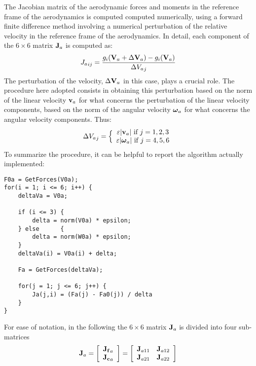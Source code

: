 The Jacobian matrix of the aerodynamic forces and moments in the reference 
frame of the aerodynamics is computed computed numerically,
using a forward finite difference method involving a numerical perturbation
of the relative velocity in the reference frame of the aerodynamics.
In detail, each component of the $6\times6$ matrix $\T{J}_a$ is computed as:
\begin{equation}
	{J_a}_{ij} = \frac{g_i(\T{V}_a + \Delta\T{V}_a) 
		- g_i(\T{V}_a)}{\Delta {V_a}_j}
\end{equation}
The perturbation of the velocity, $\Delta\T{V}_a$ in this case, plays
a crucial role. The procedure here adopted consists in obtaining this
perturbation based on the norm of the linear velocity $\T{v}_a$ for what 
concerns the perturbation of the linear velocity components, based on
the norm of the angular velocity $\T{\omega}_a$ for what concerns 
the angular velocity components. Thus:
\begin{equation}
	\Delta {V_a}_j = \Bigl\{\matr{c}{
		\varepsilon\lvert\T{v}_a\lvert\text{ if $j = 1,2,3$}\\
		\varepsilon\lvert\T{\omega}_a\lvert\text{ if $j = 4,5,6$}
		}
\end{equation}
To summarize the procedure, it can be helpful to report the algorithm
actually implemented:
\begin{verbatim}
F0a = GetForces(V0a);
for(i = 1; i <= 6; i++)	{
    deltaVa = V0a; 
				
    if (i <= 3)	{
        delta = norm(V0a) * epsilon;
    } else		{
        delta = norm(W0a) * epsilon;
    }
    deltaVa(i) = V0a(i) + delta;
					
    Fa = GetForces(deltaVa);
	
    for(j = 1; j <= 6; j++)	{
        Ja(j,i) = (Fa(j) - Fa0(j)) / delta 
    }
}
\end{verbatim}

For ease of notation, in the following the $6\times6$ matrix $\T{J}_a$ is 
divided into four sub-matrices
\begin{equation}
	\T{J}_a = \sqbr{\matr{c}{\T{J_f}_a\\\T{J_c}_a}}
	=\sqbr{\matr{cc}{\T{J}_{a11} & \T{J}_{a12}\\ \T{J}_{a21} & \T{J}_{a22}}}
\end{equation}

